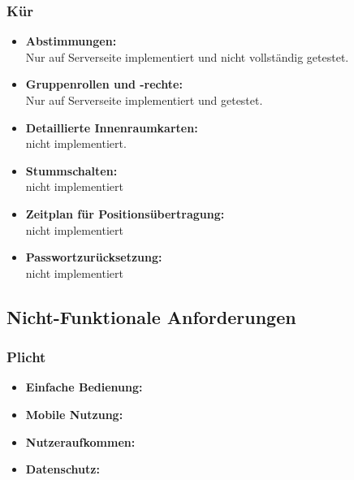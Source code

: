 \documentclass[parskip=full,11pt]{scrartcl}
\begin{document}
		\subsubsection{Kür}
			\begin{itemize}
                \item \textbf{Abstimmungen:}\\
							Nur auf Serverseite implementiert und nicht vollständig getestet.
                \item \textbf{Gruppenrollen und -rechte:}\\
							Nur auf Serverseite implementiert und getestet.
                \item \textbf{Detaillierte Innenraumkarten:}\\
							nicht implementiert.
                \item \textbf{Stummschalten:}\\
							nicht implementiert
                \item \textbf{Zeitplan für Positionsübertragung:}\\
							nicht implementiert
                \item \textbf{Passwortzurücksetzung:}\\
							nicht implementiert
			\end{itemize}

	\subsection{Nicht-Funktionale Anforderungen}
		\subsubsection{Plicht}
			\begin{itemize}
                \item \textbf{Einfache Bedienung:}\\
                \item \textbf{Mobile Nutzung:}\\
                \item \textbf{Nutzeraufkommen:}\\
                \item \textbf{Datenschutz:}\\
			\end{itemize}
\end{document}
